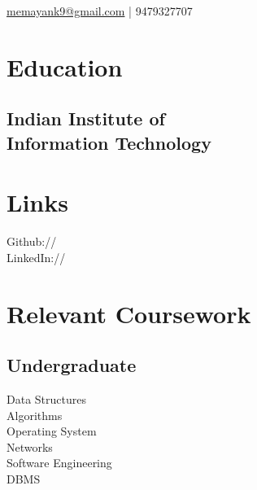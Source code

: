 \documentclass[]{single-page-resume}
\begin{document}
%
%

%
%


{ 
\href{mailto:memayank9@gmail.com}{memayank9@gmail.com} | 
9479327707
}

%
%

\begin{minipage}[t]{0.33\textwidth} 


\section{Education} 

\subsection{Indian Institute of \\
Information Technology}

\sectionsep


\section{Links} 
Github:// \href{https://github.com/saurabhMayank}{} \\
LinkedIn://  \href{https://www.linkedin.com/in/mayank95/}{} \\
\sectionsep


\section{Relevant Coursework}
\subsection{Undergraduate}
Data Structures \\
Algorithms \\
Operating System \\
Networks \\
Software Engineering \\
DBMS \\
\sectionsep


\end{minipage}
\end{document}
